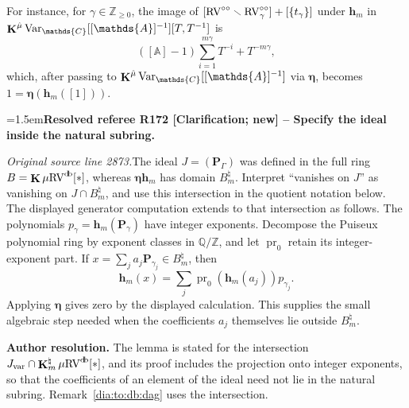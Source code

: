 \documentclass[12pt]{amsart}
\newcommand{\ResolvedRefereeRemark}[5]{%
  \par\medskip\begingroup\normalfont\small\color{gray}%
  \emergencystretch=1.5em\noindent\textbf{Resolved referee R#1 [#2] -- #3.}\par\nobreak\noindent #4\par
  \medskip\color{ResolutionGreen}\noindent\textbf{Author resolution.} #5\par
  \endgroup\medskip
}
\theoremstyle{plain}
\theoremstyle{definition}
\theoremstyle{remark}
\numberwithin{equation}{section}
\theoremstyle{plain}
\newcommand{\RV}{\textup{RV}}
\newcommand{\Z}{\mathds{Z}}
\newcommand{\A}{\mathds{A}}
\newcommand{\C}{\mathds{C}}
\newcommand{\Q}{\mathds{Q}}
\newcommand{\0}{\emptyset}
\newcommand{\mi}{\smallsetminus}
\newcommand{\mgRV}{{\mu}{\RV}}
\DeclareMathOperator{\ggk}{\mathbf{K}}
\DeclareMathOperator{\db}{d \! b}
\newcommand{\var}{\textup{Var}}
\newcommand{\gmv}{\ggk^{\hat \mu}\var_{\C}}
\begin{document}
For instance, for $\gamma \in \Z_{\geq 0}$, the image of $[\RV^{\circ \circ} \mi \RV^{\circ \circ}_{\gamma}] + [\{t_\gamma\}]$ under $\bm h_m$ in $\gmv[[\A]^{-1}][T, T^{-1}]$ is
\[
 ([\A] - 1) \sum_{i = 1}^{m\gamma} T^{-i} + T^{-m\gamma},
\]
which, after passing to $\gmv[[\A]^{-1}]$ via $\bm \eta$, becomes $1 = \bm \eta (\bm h_m([1]))$.

\ResolvedRefereeRemark{172}{Clarification; new}{Specify the ideal inside the natural subring}{%
\textit{Original source line 2873.}\quad The ideal $J=(\bm P_\Gamma)$ was defined in the full ring $B=\ggk\mgRV^{\db}[*]$, whereas $\bm\eta\bm h_m$ has domain $B_m^\natural$. Interpret ``vanishes on $J$'' as vanishing on $J\cap B_m^\natural$, and use this intersection in the quotient notation below. The displayed generator computation extends to that intersection as follows. The polynomials $p_\gamma=\bm h_m(\bm P_\gamma)$ have integer exponents. Decompose the Puiseux polynomial ring by exponent classes in $\Q/\Z$, and let $\operatorname{pr}_0$ retain its integer-exponent part. If $x=\sum_j a_j\bm P_{\gamma_j}\in B_m^\natural$, then
\[
 \bm h_m(x)=\sum_j\operatorname{pr}_0(\bm h_m(a_j))p_{\gamma_j}.
\]
Applying $\bm\eta$ gives zero by the displayed calculation. This supplies the small algebraic step needed when the coefficients $a_j$ themselves lie outside $B_m^\natural$.
}{The lemma is stated for the intersection $J_{\mathrm{var}}\cap\ggk^\natural_m\mgRV^{\db}[*]$, and its proof includes the projection onto integer exponents, so that the coefficients of an element of the ideal need not lie in the natural subring. Remark~\ref{dia:to:db:dag} uses the intersection.}
\end{document}
